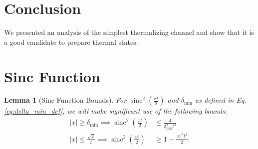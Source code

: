 \documentclass{article}
\newtheorem{lemma}[theorem]{Lemma}
\DeclareMathOperator{\sinc}{sinc}
\begin{document}
\section{Conclusion}

We presented an analysis of the simplest thermalizing channel and show that it is a good candidate to prepare thermal states.




\appendix



\section{Sinc Function}

\begin{lemma}[Sinc Function Bounds] \label{lem:sinc_poly_approx}
    For $\sinc^2\left( \frac{x t}{2} \right)$ and $\delta_{\min}$ as defined in Eq. \eqref{eq:delta_min_def}, we will make significant use of the following bounds:
    \begin{align}
        |x| \ge \delta_{\min} \implies \sinc^2 \left( \frac{x t}{2} \right) &\le \frac{4}{\delta_{\min}^2 t^2} \label{eq:sinc_upper_bound} \\
        |x| \le \frac{\sqrt{2}}{t} \implies \sinc^2\left(\frac{x t}{2} \right) &\ge 1 - \frac{|x|^2 t^2}{2}. \label{eq:sinc_lower_bound}
\end{align}

\end{lemma}
\end{document}
